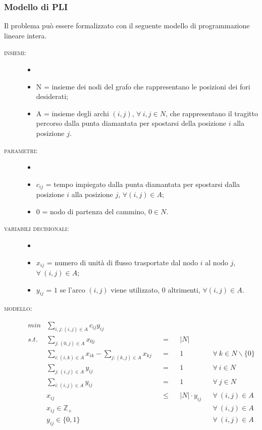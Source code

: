 \subsubsection{Modello di PLI}
Il problema può essere formalizzato con il seguente modello di programmazione lineare intera.
\begin{description}
\item[\textsc{insiemi:}]
	\begin{itemize}
	\item[]
	\item N = insieme dei nodi del grafo che rappresentano le posizioni dei fori desiderati;
	\item A = insieme degli archi $(i, j)$, $\forall\ i, j \in N$, che rappresentano il tragitto percorso dalla punta diamantata per spostarsi della posizione $i$ alla posizione $j$.
	\end{itemize}
\item[\textsc{parametri:}]
	\begin{itemize}
	\item[]
	\item $c_{ij}$ = tempo impiegato dalla punta diamantata per spostarsi dalla posizione $i$ alla posizione $j$, $\forall (i, j) \in A$;
	\item $0$ = nodo di partenza del cammino, $0 \in N$.
	\end{itemize}
\item[\textsc{variabili decisionali:}]
	\begin{itemize}
	\item[]
	\item $x_{ij}$ = numero di unità di flusso trasportate dal nodo $i$ al nodo $j$, $\forall\ (i, j) \in A$;
	\item $y_{ij}$ = $1$ se l'arco $(i, j)$ viene utilizzato, $0$ altrimenti, $\forall (i, j) \in A$.
	\end{itemize}
\item[\textsc{modello:}]
	\begin{align}
	min 	&\sum_{i,j:(i,j) \in A} c_{ij} y_{ij} \label{eqn:obiettivo}\\
	s.t. 	&\sum_{j:(0,j) \in A} x_{0j} 								& &= 		& &|N| \label{eqn:sorgente}\\
			&\sum_{i:(i,k) \in A} x_{ik} - \sum_{j:(k,j) \in A} x_{kj} 	& &= 		& & 1 			& &\forall\ k \in N \backslash \{0\} \label{eqn:flusso} \\
			&\sum_{j:(i,j) \in A} y_{ij} 								& &= 		& & 1 			& &\forall\ i \in N \label{eqn:entrante} \\
			&\sum_{i:(i,j) \in A} y_{ij} 								& &= 		& & 1 			& &\forall\ j \in N \label{eqn:uscente} \\
			& x_{ij} 													& & \leq 	& & |N| \cdot y_{ij} 	& &\forall\ (i,j) \in A \label{eqn:relazione}\\
			& x_{ij} \in \mathbb{Z_+}									& & 		& &				& &\forall\ (i,j) \in A \label{eqn:intere}\\
			& y_{ij} \in \{0,1\}										& &			& &				& &\forall\ (i,j) \in A \label{eqn:binarie}
	\end{align}
\end{description}